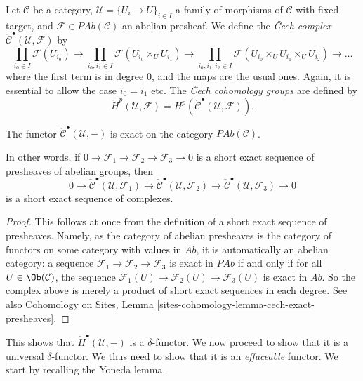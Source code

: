 \begin{definition}
\label{definition-cech-complex}
Let $\mathcal{C}$ be a category,
$\mathcal{U} = \{U_i \to U\}_{i \in I}$ a family of morphisms of $\mathcal{C}$
with fixed target, and $\mathcal{F} \in \textit{PAb}(\mathcal{C})$ an abelian
presheaf. We define the {\it {\v C}ech complex}
$\check{\mathcal{C}}^\bullet(\mathcal{U}, \mathcal{F})$ by
$$
\prod_{i_0\in I} \mathcal{F}(U_{i_0}) \to
\prod_{i_0, i_1\in I} \mathcal{F}(U_{i_0} \times_U U_{i_1}) \to
\prod_{i_0, i_1, i_2 \in I}
\mathcal{F}(U_{i_0} \times_U U_{i_1} \times_U U_{i_2}) \to \ldots
$$
where the first term is in degree 0, and the maps are the usual ones. Again, it
is essential to allow the case $i_0 = i_1$ etc. The
{\it {\v C}ech cohomology groups} are defined by
$$
\check{H}^p(\mathcal{U}, \mathcal{F}) =
H^p(\check{\mathcal{C}}^\bullet(\mathcal{U}, \mathcal{F})).
$$
\end{definition}

\begin{lemma}
\label{lemma-cech-presheaves}
The functor $\check{\mathcal{C}}^\bullet(\mathcal{U}, -)$
is exact on the category $\textit{PAb}(\mathcal{C})$.
\end{lemma}

\noindent
In other words, if $0\to \mathcal{F}_1\to \mathcal{F}_2\to \mathcal{F}_3\to 0$
is a short exact sequence of presheaves of abelian groups, then
$$
0 \to \check{\mathcal{C}}^\bullet\left(\mathcal{U}, \mathcal{F}_1\right)
\to\check{\mathcal{C}}^\bullet(\mathcal{U}, \mathcal{F}_2) \to
\check{\mathcal{C}}^\bullet(\mathcal{U}, \mathcal{F}_3)\to 0
$$
is a short exact sequence of complexes.

\begin{proof}
This follows at once from the definition of a short exact sequence of
presheaves. Namely, as the category of abelian presheaves is the category of
functors on some category with values in $\textit{Ab}$, it is automatically an
abelian category: a sequence $\mathcal{F}_1\to \mathcal{F}_2\to \mathcal{F}_3$
is exact in $\textit{PAb}$ if and only if for all
$U \in \Ob(\mathcal{C})$, the sequence
$\mathcal{F}_1(U) \to \mathcal{F}_2(U) \to \mathcal{F}_3(U)$ is exact in
$\textit{Ab}$. So the complex above is merely a product of short exact
sequences in each degree. See also
Cohomology on Sites, Lemma \ref{sites-cohomology-lemma-cech-exact-presheaves}.
\end{proof}

\noindent
This shows that $\check{H}^\bullet(\mathcal{U}, -)$ is a $\delta$-functor.
We now proceed to show that it is a universal $\delta$-functor. We thus need to
show that it is an {\it effaceable} functor. We start by recalling the Yoneda
lemma.

